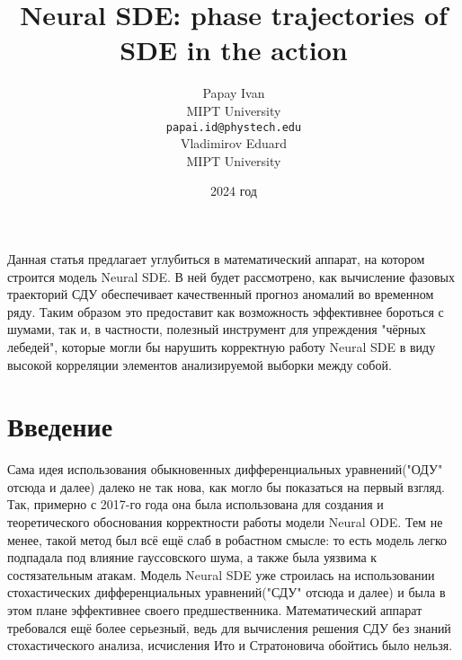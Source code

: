 \documentclass{article}
\title{Neural SDE: phase trajectories of SDE in the action}
\author{ Papay Ivan\\
	MIPT University \\
	\texttt{papai.id@phystech.edu} \\
	\And
	Vladimirov Eduard \\
	MIPT University\\
}
\date{2024 год}
\begin{document}
\maketitle

\begin{Abstract}
    Данная статья предлагает углубиться в математический аппарат, на котором строится модель Neural SDE. В ней будет рассмотрено, как вычисление фазовых траекторий СДУ обеспечивает качественный прогноз аномалий во временном ряду. Таким образом это предоставит как возможность эффективнее бороться с шумами, так и, в частности, полезный инструмент для упреждения "чёрных лебедей", которые могли бы нарушить корректную работу Neural SDE в виду высокой корреляции элементов анализируемой выборки между собой.
\end{Abstract}



\section{Введение}
   \par Сама идея использования обыкновенных дифференциальных уравнений("ОДУ" отсюда и далее) далеко не так нова, как могло бы показаться на первый взгляд. Так, примерно с 2017-го года она была использована для создания и теоретического обоснования корректности работы модели Neural ODE. Тем не менее, такой метод был всё ещё слаб в робастном смысле: то есть модель легко подпадала под влияние гауссовского шума, а также была уязвима к состязательным атакам. Модель Neural SDE уже строилась на использовании стохастических дифференциальных уравнений("СДУ" отсюда и далее) и была в этом плане эффективнее своего предшественника. Математический аппарат требовался ещё более серьезный, ведь для вычисления решения СДУ без знаний стохастического анализа, исчисления Ито и Стратоновича обойтись было нельзя.
   
\end{document}
